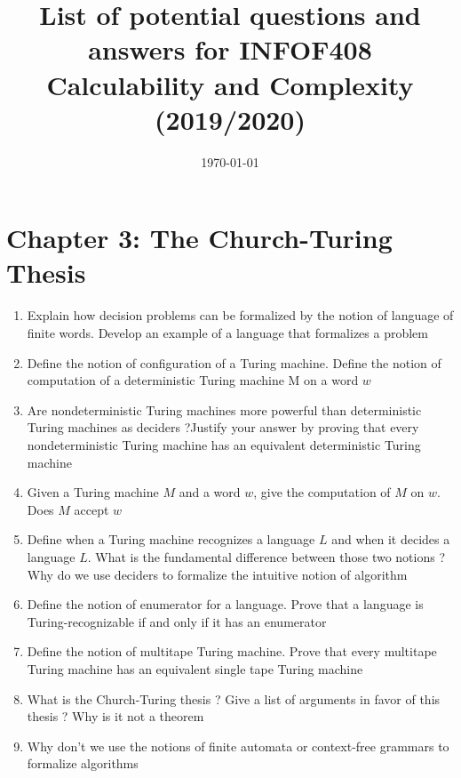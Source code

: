 \documentclass{article}
\title{List of potential questions and answers for INFOF408 Calculability and Complexity (2019/2020)}
\date{\today}
\begin{document}
\maketitle
\tableofcontents
\clearpage

\section{Chapter 3: The Church-Turing Thesis}

\begin{enumerate}

\item Explain how decision problems can be formalized by the notion of language of finite words. Develop an example of a language that formalizes a problem

\item Define the notion of configuration of a Turing machine. Define the notion of computation of a deterministic Turing machine M on a word $w$

\item Are nondeterministic Turing machines more powerful than deterministic Turing machines as deciders ?Justify your answer by proving that every nondeterministic Turing machine has an equivalent deterministic Turing machine

\item Given a Turing machine $M$ and a word $w$, give the computation of $M$ on $w$. Does $M$ accept $w$ 

\item Define when a Turing machine recognizes a language $L$ and when it decides a language $L$. What is the fundamental difference between those two notions ? Why do we use deciders to formalize the intuitive notion of algorithm 

\item Define the notion of enumerator for a language. Prove that a language is Turing-recognizable if and only if it has an enumerator

\item Define the notion of multitape Turing machine. Prove that every multitape Turing machine has an equivalent single tape Turing machine

\item What is the Church-Turing thesis ? Give a list of arguments in favor of this thesis ? Why is it not a theorem 

\item Why don’t we use the notions of finite automata or context-free grammars to formalize algorithms 
\end{enumerate}
\end{document}
